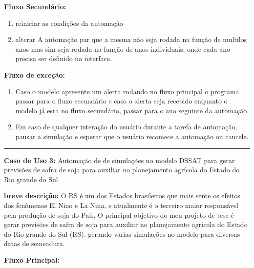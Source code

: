 \documentclass[12pt]{article}
\begin{document}
	{\bf Fluxo Secundário:}
	
	\begin{enumerate}
		\item reiniciar as condições da automação
		\item alterar A automação par que a mesma não seja rodada na função de multilos anos mas sim seja rodada na função de anos individuais, onde cada ano precisa ser definido na interface.
	\end{enumerate}
	
	{\bf Fluxo de exceção:}
	
	\begin{enumerate}
		\item Caso o modelo apresente um alerta rodando no fluxo principal o programa passar para o fluxo secundário e caso o alerta seja recebido enquanto o modelo já esta no fluxo secundário, passar para o ano seguinte da automação.
		\item Em caso de qualquer interação do usuário durante a tarefa de automação, pausar a simulação e esperar que o usuário recomece a automação ou cancele.
	\end{enumerate}
	
	\bigskip \hrule \bigskip

	
	{\bf Caso de Uso 3:} Automação de de simulações no modelo DSSAT para gerar previsões de safra de soja para auxiliar no planejamento agrícola do Estado do Rio grande do Sul
	\bigskip
	
	{\bf breve descrição:} O RS é um dos Estados brasileiros que mais sente os efeitos dos fenômenos El Nino e La Nina, e atualmente é o terceiro maior responsável pela produção de soja do País. O principal objetivo do meu projeto de tese é gerar previsões de safra de soja para auxiliar no planejamento agrícola do Estado do Rio grande do Sul (RS). gerando varias simulações no modelo para diversas datas de semeadura.
	\bigskip
	
	{\bf Fluxo Principal:}
	
\end{document}
